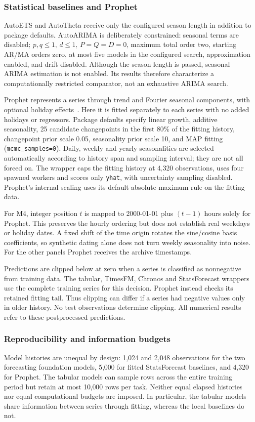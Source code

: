 \subsubsection{Statistical baselines and Prophet}
AutoETS and AutoTheta receive only the configured season length in addition to package defaults. AutoARIMA is deliberately constrained: seasonal terms are disabled; $p,q\leq1$, $d\leq1$, $P=Q=D=0$, maximum total order two, starting AR/MA orders zero, at most five models in the configured search, approximation enabled, and drift disabled. Although the season length is passed, seasonal ARIMA estimation is not enabled. Its results therefore characterize a computationally restricted comparator, not an exhaustive ARIMA search.

Prophet represents a series through trend and Fourier seasonal components, with optional holiday effects~\cite{prophet_paper,prophet_seasonality}. Here it is fitted separately to each series with no added holidays or regressors. Package defaults specify linear growth, additive seasonality, 25 candidate changepoints in the first 80\% of the fitting history, changepoint prior scale 0.05, seasonality prior scale 10, and MAP fitting (\texttt{mcmc\_samples=0}). Daily, weekly and yearly seasonalities are selected automatically according to history span and sampling interval; they are not all forced on. The wrapper caps the fitting history at 4,320 observations, uses four spawned workers and scores only \texttt{yhat}, with uncertainty sampling disabled. Prophet's internal scaling uses its default absolute-maximum rule on the fitting data.

For M4, integer position $t$ is mapped to 2000-01-01 plus $(t-1)$ hours solely for Prophet. This preserves the hourly ordering but does not establish real weekdays or holiday dates. A fixed shift of the time origin rotates the sine/cosine basis coefficients, so synthetic dating alone does not turn weekly seasonality into noise. For the other panels Prophet receives the archive timestamps.

Predictions are clipped below at zero when a series is classified as nonnegative from training data. The tabular, TimesFM, Chronos and StatsForecast wrappers use the complete training series for this decision. Prophet instead checks its retained fitting tail. Thus clipping can differ if a series had negative values only in older history. No test observations determine clipping. All numerical results refer to these postprocessed predictions.

\subsubsection{Reproducibility and information budgets}
Model histories are unequal by design: 1,024 and 2,048 observations for the two forecasting foundation models, 5,000 for fitted StatsForecast baselines, and 4,320 for Prophet. The tabular models can sample rows across the entire training period but retain at most 10,000 rows per task. Neither equal elapsed histories nor equal computational budgets are imposed. In particular, the tabular models share information between series through fitting, whereas the local baselines do not.

